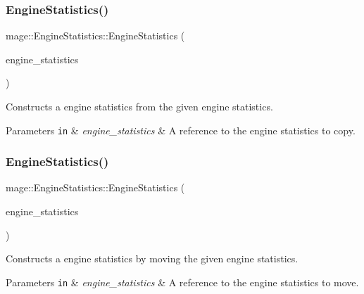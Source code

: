 \subsubsection{\texorpdfstring{Engine\+Statistics()}{EngineStatistics()}\hspace{0.1cm}{\footnotesize\ttfamily [2/3]}}
{\footnotesize\ttfamily mage\+::\+Engine\+Statistics\+::\+Engine\+Statistics (\begin{DoxyParamCaption}\item[{const \hyperlink{classmage_1_1_engine_statistics}{Engine\+Statistics} \&}]{engine\+\_\+statistics }\end{DoxyParamCaption})\hspace{0.3cm}{\ttfamily [default]}}

Constructs a engine statistics from the given engine statistics.


\begin{DoxyParams}[1]{Parameters}
\mbox{\tt in}  & {\em engine\+\_\+statistics} & A reference to the engine statistics to copy. \\
\hline
\end{DoxyParams}
\hypertarget{classmage_1_1_engine_statistics_acb3eb7a8f16733d29b4a0e4490723cd5}{}\label{classmage_1_1_engine_statistics_acb3eb7a8f16733d29b4a0e4490723cd5} 
\subsubsection{\texorpdfstring{Engine\+Statistics()}{EngineStatistics()}\hspace{0.1cm}{\footnotesize\ttfamily [3/3]}}
{\footnotesize\ttfamily mage\+::\+Engine\+Statistics\+::\+Engine\+Statistics (\begin{DoxyParamCaption}\item[{\hyperlink{classmage_1_1_engine_statistics}{Engine\+Statistics} \&\&}]{engine\+\_\+statistics }\end{DoxyParamCaption})\hspace{0.3cm}{\ttfamily [default]}}

Constructs a engine statistics by moving the given engine statistics.


\begin{DoxyParams}[1]{Parameters}
\mbox{\tt in}  & {\em engine\+\_\+statistics} & A reference to the engine statistics to move. \\
\hline
\end{DoxyParams}
\hypertarget{classmage_1_1_engine_statistics_a471f643061b881ae69cc807b34c48127}{}\label{classmage_1_1_engine_statistics_a471f643061b881ae69cc807b34c48127} 
